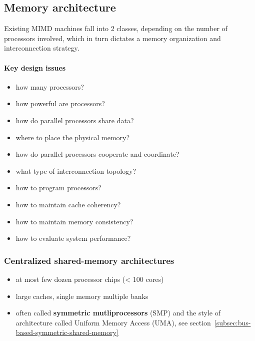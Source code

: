 \subsection{Memory architecture}\label{subsec:memory-architecture}
Existing MIMD machines fall into 2 classes, depending on the number
of processors involved, which in turn dictates a memory organization
and interconnection strategy.

\paragraph{Key design issues}
\begin{itemize}
    \item how many processors?
    \item how powerful are processors?
    \item how do parallel processors share data?
    \item where to place the physical memory?
    \item how do parallel processors cooperate and coordinate?
    \item what type of interconnection topology?
    \item how to program processors?
    \item how to maintain cache coherency?
    \item how to maintain memory consistency?
    \item how to evaluate system performance?
\end{itemize}

\subsubsection{Centralized shared-memory architectures}\label{subsubsec:centralized-shared-memory-architectures}
\begin{itemize}
    \item at most few dozen processor chips (< 100 cores)
    \item large caches, single memory multiple banks
    \item often called \textbf{symmetric mutliprocessors} (SMP) and the
    style of architecture called Uniform Memory Access (UMA), see section~\ref{subsec:bus-based-symmetric-shared-memory}
\end{itemize}

